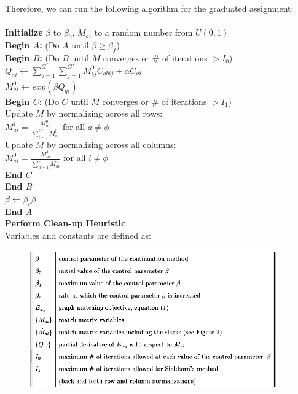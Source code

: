 Therefore, we can run the following algorithm for the graduated assignment:\\
\\
\textbf{Initialize} $\beta$ to $\beta_{0}$, $M_{ai}$ to a random number from $U(0,1)$\\
\textbf{Begin $A$:} (Do $A$ until $\beta \geq \beta_{f}$)\\
\indent \textbf{Begin $B$:} (Do $B$ until $M$ converges or \# of iterations $>I_0$)\\
\indent $Q_{ai} \leftarrow \sum_{b=1}^{G}\sum_{j=1}^{G'}M_{bj}^{0}C_{abij}+\alpha C_{ai}$\\
\indent $M_{ai}^{0} \leftarrow exp(\beta Q_{qi})$\\
\indent \indent \textbf{Begin $C$:} (Do $C$ until $M$ converges or \# of iterations $>I_1$)\\
\indent \indent  Update $M$ by normalizing across all rows:\\
\indent \indent  $M_{ai}^{1}=\frac{M_{ai}^{0}}{\sum_{i=1}^{G'}M_{ai}^{0}}$ for all $a\neq\phi$\\
\indent \indent  Update $M$ by normalizing across all columns:\\
\indent \indent  $M_{ai}^{0}=\frac{M_{ai}^{1}}{\sum_{a=1}^{G}M_{ai}^{1}}$ for all $i\neq\phi$\\
\indent \indent \textbf{End $C$}\\
\indent \textbf{End $B$}\\
$\beta\leftarrow\beta_{r}\beta$\\
\textbf{End $A$}\\
\textbf{Perform Clean-up Heuristic}\\

Variables and constants are defined as:
\begin{figure}[h]
	\centering
	\captionsetup{justification=centering}
	\includegraphics[width=0.95\textwidth]{figs/algorithm_variable.png}
\end{figure}

